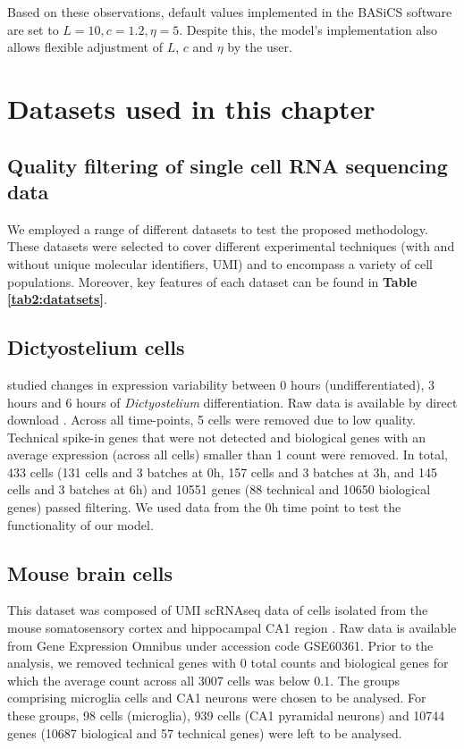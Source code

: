 Based on these observations, default values implemented in the BASiCS software are set to $L=10, c=1.2, \eta=5$. Despite this, the model's implementation also allows flexible adjustment of $L$, $c$ and $\eta$ by the user. 

\section{Datasets used in this chapter} \label{sec2:datasets}

\subsection*{Quality filtering of single cell RNA sequencing data}
We employed a range of different datasets to test the proposed methodology. These datasets were selected to cover different experimental techniques (with and without unique molecular identifiers, UMI) and to encompass a variety of cell populations. Moreover, key features of each dataset can be found in \textbf{Table \ref{tab2:datatsets}}. 

\subsection{Dictyostelium cells} \label{seq::data_dict}

\cite{Antolovic2017} studied changes in expression variability between 0 hours (undifferentiated), 3 hours and 6 hours of \emph{Dictyostelium} differentiation. Raw data is available by direct download \citep[see Data S1 in][]{Antolovic2017}. Across all time-points, 5 cells were removed due to low quality. Technical spike-in genes that were not detected and biological genes with an average expression (across all cells) smaller than 1 count were removed. In total, 433 cells (131 cells and 3 batches at 0h, 157 cells and 3 batches at 3h, and 145 cells and 3 batches at 6h) and 10551 genes (88 technical and 10650 biological genes) passed filtering. We used data from the 0h time point to test the functionality of our model.

\subsection{Mouse brain cells} \label{seq::data_micro}
This dataset was composed of UMI scRNAseq data of cells isolated from the mouse somatosensory cortex and hippocampal CA1 region \citep{Zeisel2015}. Raw data is available from Gene Expression Omnibus under accession code GSE60361. 
Prior to the analysis, we removed technical genes with 0 total counts and biological genes for which the average count across all 3007 cells was below 0.1. The groups comprising microglia cells and CA1 neurons were chosen to be analysed. For these groups, 98 cells (microglia), 939 cells (CA1 pyramidal neurons) and 10744 genes (10687 biological and 57 technical genes) were left to be analysed.

